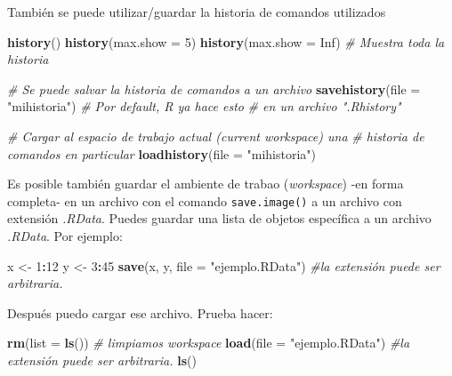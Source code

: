 \documentclass[]{article}
\newenvironment{Shaded}{\begin{snugshade}}{\end{snugshade}}
\newcommand{\KeywordTok}[1]{\textcolor[rgb]{0.13,0.29,0.53}{\textbf{#1}}}
\newcommand{\DataTypeTok}[1]{\textcolor[rgb]{0.13,0.29,0.53}{#1}}
\newcommand{\DecValTok}[1]{\textcolor[rgb]{0.00,0.00,0.81}{#1}}
\newcommand{\StringTok}[1]{\textcolor[rgb]{0.31,0.60,0.02}{#1}}
\newcommand{\CommentTok}[1]{\textcolor[rgb]{0.56,0.35,0.01}{\textit{#1}}}
\newcommand{\OtherTok}[1]{\textcolor[rgb]{0.56,0.35,0.01}{#1}}
\newcommand{\OperatorTok}[1]{\textcolor[rgb]{0.81,0.36,0.00}{\textbf{#1}}}
\newcommand{\NormalTok}[1]{#1}
\begin{document}
También se puede utilizar/guardar la historia de comandos utilizados

\begin{Shaded}
\begin{Highlighting}[]
\KeywordTok{history}\NormalTok{()}
\KeywordTok{history}\NormalTok{(}\DataTypeTok{max.show =} \DecValTok{5}\NormalTok{)}
\KeywordTok{history}\NormalTok{(}\DataTypeTok{max.show =} \OtherTok{Inf}\NormalTok{) }\CommentTok{# Muestra toda la historia}

\CommentTok{# Se puede salvar la historia de comandos a un archivo}
\KeywordTok{savehistory}\NormalTok{(}\DataTypeTok{file =} \StringTok{"mihistoria"}\NormalTok{) }\CommentTok{# Por default, R ya hace esto }
\CommentTok{# en un archivo ".Rhistory"}

\CommentTok{# Cargar al espacio de trabajo actual (current workspace) una }
\CommentTok{# historia de comandos en particular}
\KeywordTok{loadhistory}\NormalTok{(}\DataTypeTok{file =} \StringTok{"mihistoria"}\NormalTok{)}
\end{Highlighting}
\end{Shaded}

Es posible también guardar el ambiente de trabao (\emph{workspace}) -en
forma completa- en un archivo con el comando \texttt{save.image()} a un
archivo con extensión \emph{.RData}. Puedes guardar una lista de objetos
específica a un archivo \emph{.RData}. Por ejemplo:

\begin{Shaded}
\begin{Highlighting}[]
\NormalTok{x <-}\StringTok{ }\DecValTok{1}\OperatorTok{:}\DecValTok{12}
\NormalTok{y <-}\StringTok{ }\DecValTok{3}\OperatorTok{:}\DecValTok{45}
\KeywordTok{save}\NormalTok{(x, y, }\DataTypeTok{file =} \StringTok{"ejemplo.RData"}\NormalTok{) }\CommentTok{#la extensión puede ser arbitraria.}
\end{Highlighting}
\end{Shaded}

Después puedo cargar ese archivo. Prueba hacer:

\begin{Shaded}
\begin{Highlighting}[]
\KeywordTok{rm}\NormalTok{(}\DataTypeTok{list =} \KeywordTok{ls}\NormalTok{()) }\CommentTok{# limpiamos workspace}
\KeywordTok{load}\NormalTok{(}\DataTypeTok{file =} \StringTok{"ejemplo.RData"}\NormalTok{) }\CommentTok{#la extensión puede ser arbitraria.}
\KeywordTok{ls}\NormalTok{()}
\end{Highlighting}
\end{Shaded}
\end{document}
